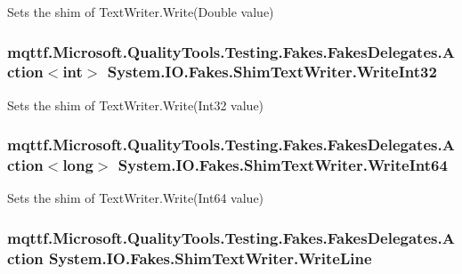 Sets the shim of Text\-Writer.\-Write(\-Double value)

\hypertarget{class_system_1_1_i_o_1_1_fakes_1_1_shim_text_writer_a6dc8662260ee802ca5451398e7fd2e5a}{
\subsubsection[{Write\-Int32}]{\setlength{\rightskip}{0pt plus 5cm}mqttf.\-Microsoft.\-Quality\-Tools.\-Testing.\-Fakes.\-Fakes\-Delegates.\-Action$<$int$>$ System.\-I\-O.\-Fakes.\-Shim\-Text\-Writer.\-Write\-Int32\hspace{0.3cm}{\ttfamily [set]}}}\label{class_system_1_1_i_o_1_1_fakes_1_1_shim_text_writer_a6dc8662260ee802ca5451398e7fd2e5a}


Sets the shim of Text\-Writer.\-Write(\-Int32 value)

\hypertarget{class_system_1_1_i_o_1_1_fakes_1_1_shim_text_writer_a6c1ae3c01c0e7ffbbaef7987d6c8ee6e}{
\subsubsection[{Write\-Int64}]{\setlength{\rightskip}{0pt plus 5cm}mqttf.\-Microsoft.\-Quality\-Tools.\-Testing.\-Fakes.\-Fakes\-Delegates.\-Action$<$long$>$ System.\-I\-O.\-Fakes.\-Shim\-Text\-Writer.\-Write\-Int64\hspace{0.3cm}{\ttfamily [set]}}}\label{class_system_1_1_i_o_1_1_fakes_1_1_shim_text_writer_a6c1ae3c01c0e7ffbbaef7987d6c8ee6e}


Sets the shim of Text\-Writer.\-Write(\-Int64 value)

\hypertarget{class_system_1_1_i_o_1_1_fakes_1_1_shim_text_writer_a780191221728ef4adcb9a5acc4aca638}{
\subsubsection[{Write\-Line}]{\setlength{\rightskip}{0pt plus 5cm}mqttf.\-Microsoft.\-Quality\-Tools.\-Testing.\-Fakes.\-Fakes\-Delegates.\-Action System.\-I\-O.\-Fakes.\-Shim\-Text\-Writer.\-Write\-Line\hspace{0.3cm}{\ttfamily [set]}}}\label{class_system_1_1_i_o_1_1_fakes_1_1_shim_text_writer_a780191221728ef4adcb9a5acc4aca638}


